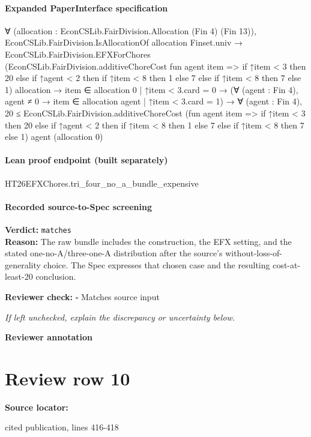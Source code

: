 \documentclass[10pt]{article}
\newcommand{\reviewerbox}{%
  \par\noindent\fbox{\parbox{0.96\linewidth}{\rule{0pt}{0.38in}}}\par
}
\newcommand{\reviewmatch}[1]{%
  \par\noindent\textbf{Reviewer check:} $\square$\; #1\par
  \noindent\emph{If left unchecked, explain the discrepancy or uncertainty below.}\par
}
\begin{document}
\paragraph{Expanded PaperInterface specification}
\begin{ReviewVerbatim}
∀ (allocation : EconCSLib.FairDivision.Allocation (Fin 4) (Fin 13)),
  EconCSLib.FairDivision.IsAllocationOf allocation Finset.univ →
    EconCSLib.FairDivision.EFXForChores
        (EconCSLib.FairDivision.additiveChoreCost fun agent item =>
          if ↑item < 3 then 20 else if ↑agent < 2 then if ↑item < 8 then 1 else 7 else if ↑item < 8 then 7 else 1)
        allocation →
      {item ∈ allocation 0 | ↑item < 3}.card = 0 →
        (∀ (agent : Fin 4), agent ≠ 0 → {item ∈ allocation agent | ↑item < 3}.card = 1) →
          ∀ (agent : Fin 4),
            20 ≤
              EconCSLib.FairDivision.additiveChoreCost
                (fun agent item =>
                  if ↑item < 3 then 20
                  else if ↑agent < 2 then if ↑item < 8 then 1 else 7 else if ↑item < 8 then 7 else 1)
                agent (allocation 0)
\end{ReviewVerbatim}

\paragraph{Lean proof endpoint (built separately)}\begin{ReviewVerbatim}
HT26EFXChores.tri_four_no_a_bundle_expensive
\end{ReviewVerbatim}

\paragraph{Recorded source-to-Spec screening}
\textbf{Verdict:} \texttt{matches}
\\
\textbf{Reason:} The raw bundle includes the construction, the EFX setting, and the stated one-no-A/three-one-A distribution after the source's without-loss-of-generality choice. The Spec expresses that chosen case and the resulting cost-at-least-20 conclusion.
\reviewmatch{Matches source input}
\noindent\textbf{Reviewer annotation}\par
\reviewerbox
\clearpage
\hypertarget{source-claim-8bed2d2e9152e71d}{}
\section*{Review row 10}
\textbf{Source locator:} {\footnotesize\raggedright cited publication, lines 416-\allowbreak{}418\par}
\end{document}
